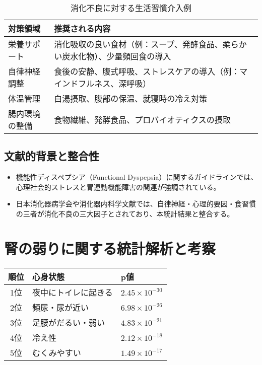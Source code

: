 \documentclass[a4paper,12pt]{article}
\begin{document}
\begin{table}[H]
\centering
\begin{tabular}{|l|p{10cm}|}
\hline
対策領域 & 推奨される内容 \\
\hline
栄養サポート & 消化吸収の良い食材（例：スープ、発酵食品、柔らかい炭水化物）、少量頻回食の導入 \\
自律神経調整 & 食後の安静、腹式呼吸、ストレスケアの導入（例：マインドフルネス、深呼吸） \\
体温管理 & 白湯摂取、腹部の保温、就寝時の冷え対策 \\
腸内環境の整備 & 食物繊維、発酵食品、プロバイオティクスの摂取 \\
\hline
\end{tabular}
\caption{消化不良に対する生活習慣介入例}
\end{table}

\subsection*{文献的背景と整合性}

\begin{itemize}
  \item 機能性ディスペプシア（Functional Dyspepsia）に関するガイドラインでは、心理社会的ストレスと胃運動機能障害の関連が強調されている。
  \item 日本消化器病学会や消化器内科学文献では、自律神経・心理的要因・食習慣の三者が消化不良の三大因子とされており、本統計結果と整合する。
\end{itemize}


\section{腎の弱りに関する統計解析と考察}

\begin{table}[h]
\centering
\begin{tabular}{|c|l|l|}
\hline
\textbf{順位} & \textbf{心身状態} & \textbf{p値} \\
\hline
1位  & 夜中にトイレに起きる     & $2.45 \times 10^{-30}$ \\
2位  & 頻尿・尿が近い           & $6.98 \times 10^{-26}$ \\
3位  & 足腰がだるい・弱い        & $4.83 \times 10^{-21}$ \\
4位  & 冷え性                 & $2.12 \times 10^{-18}$ \\
5位  & むくみやすい             & $1.49 \times 10^{-17}$ \\
\hline
\end{tabular}
\end{table}
\end{document}
